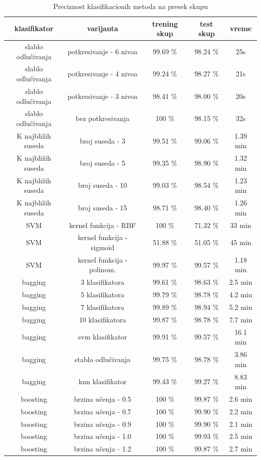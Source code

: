 \documentclass[a4paper]{article}
\begin{document}
\begin{table}[h!]
\centering
\begin{tabular}{|c c c c c|} 
 \hline
  klasifikator & varijanta & trening skup  & test skup & vreme 
  \\ [0.5ex] 
 \hline
 slablo odlučivanja & potkresivanje - 6 nivoa & 99.69 \% &  98.24 \% & 25s \\
 slablo odlučivanja & potkresivanje - 4 nivoa & 99.24 \% &  98.27 \% & 21s \\
  slablo odlučivanja & potkresivanje - 3 nivoa & 98.41 \% &  98.00 \% & 20s \\
 slablo odlučivanja & bez potkresivanja & 100 \% &  98.15 \% & 32s \\
 K najbližih suseda & broj suseda - 3 & 99.51 \% &  99.06 \% & 1.39 min \\
 K najbližih suseda & broj suseda - 5 & 99.35 \% &  98.90 \% & 1.32 min \\
 K najbližih suseda & broj suseda - 10 & 99.03 \% &  98.54 \% & 1.23 min \\
 K najbližih suseda & broj suseda - 15 & 98.71 \% &  98.40 \% & 1.26 min \\
 SVM & kernel funkcija - RBF & 100 \% &  71.32 \% & 33 min \\
 SVM & kernel funkcija - sigmoid & 51.88 \% &  51.05 \% & 45 min \\
 SVM & kernel funkcija - polinom. & 99.97 \% &  99.57 \% & 1.18 min \\
 
bagging & 3 klasifikatora & 99.61 \% &  98.63 \% & 2.5 min \\
bagging & 5 klasifikatora & 99.79 \% &  98.78 \% & 4.2 min \\
bagging & 7 klasifikatora & 99.89 \% &  98.94 \% & 5.2 min \\
bagging & 10 klasifikatora & 99.87 \% &  98.78 \% & 7.7 min \\

bagging & svm klasifikator & 99.91 \% &  99.57 \% & 16.1 min \\
bagging & stablo odlučivanja & 99.75 \% &  98.78 \% & 3.86 min\\
bagging & knn klasifikator & 99.43 \% &  99.27 \% & 8.83 min \\

boosting & brzina učenja - 0.5 & 100 \% &  99.87 \% & 2.6 min \\
boosting & brzina učenja - 0.7 & 100 \% &  99.90 \% & 2.2 min \\
boosting & brzina učenja - 0.9 & 100 \% &  99.90 \% & 2.1 min \\
boosting & brzina učenja - 1.0 & 100 \% &  99.93 \% & 2.5 min \\
boosting & brzina učenja - 1.2 & 100 \% &  99.87 \% & 2.7 min \\
 \hline
\end{tabular}
\caption{Preciznost klasifikacionih metoda na presek skupu}
\label{table:dodatak}
\end{table}
\end{document}
